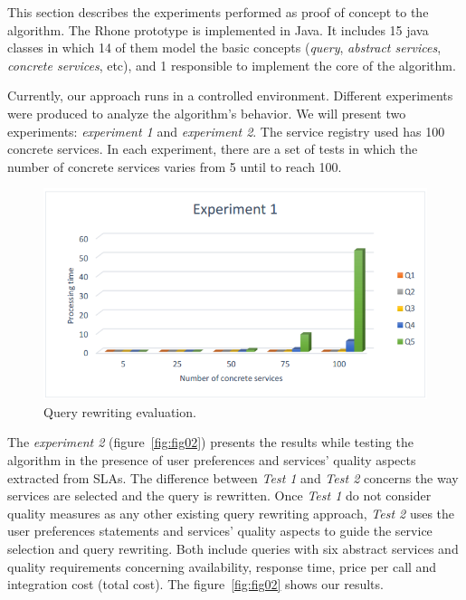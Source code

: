This section describes the experiments performed as proof of concept to the algorithm.
The Rhone prototype is implemented in Java.
It includes 15 java classes in which 14 of them model the basic concepts 
(\textit{query}, \textit{abstract services}, \textit{concrete services}, etc), 
and 1 responsible to implement the core of the algorithm. 

Currently, our approach runs in a controlled environment. 
Different experiments were produced to analyze the algorithm's behavior.
We will present two experiments: \textit{experiment 1} and \textit{experiment 2}.
The service registry used has 100 concrete services. 
In each experiment, there are a set of tests in which the number of concrete 
services varies from 5 until to reach 100.

\begin{figure}[!h]
\centering
\includegraphics[scale=0.4]{exp1.png}
\caption{Query rewriting evaluation.}\label{fig01}
\end{figure} 

The \textit{experiment 2} (figure~\ref{fig:fig02}) presents the results while testing the algorithm in the presence of user preferences and services' quality aspects extracted from SLAs.  The difference between \textit{Test 1} and \textit{Test 2} concerns the way services are selected and the query is rewritten. Once \textit{Test 1} do not consider quality measures as any other existing query rewriting approach, \textit{Test 2} uses the user preferences statements and services' quality aspects to guide the service selection and query rewriting.
Both include queries with six abstract services and quality requirements concerning availability, response time, price per call and integration cost (total cost). The figure~\ref{fig:fig02} shows our results. 

